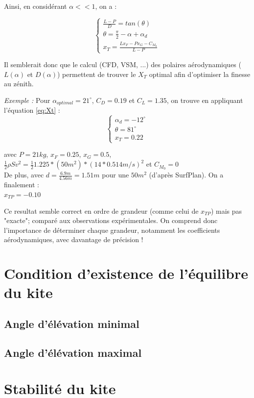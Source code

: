 Ainsi, en considérant $\alpha << 1$, on a :

\begin{equation}
    \begin{cases}
    \frac{L-P}{D} = tan(\theta) \\
    \theta = \frac{\pi}{2} - \alpha + \alpha_d \\
    x_T = \frac{L x_F - P x_G -C_{M_0}}{L - P}
    \end{cases}
    \label{eq:Xt}
\end{equation}
    
Il semblerait donc que le calcul (CFD, VSM, ...) des polaires aérodynamiques ($L(\alpha)$ et $D(\alpha)$) permettent de trouver le $X_T$ optimal afin d'optimiser la finesse au zénith. 

\textit{Exemple : }
Pour $\alpha_{optimal} = 21^\circ$, $C_D = 0.19$ et $C_L = 1.35$, on trouve en appliquant l'équation \ref{eq:Xt} : \\

\begin{equation}
    \begin{cases}
    \alpha_d =  -12^\circ\\
    \theta = 81^\circ\\
    x_T = 0.22
    \end{cases}
    \label{eq:Xt results}
\end{equation}

avec $P = 21 kg$, $x_F = 0.25$, $x_G = 0.5$,$\frac{1}{2} \rho S v^2 = \frac{1}{2} 1.225 * (50m^2) * (14 * 0.514 m/s)^2$  et $C_{M_0} = 0$ \\

De plus, avec  $d = \frac{6.9 m}{4.56 m} = 1.51 m$ pour une $50m^2$ (d'après SurfPlan). On a finalement :\\
$x_{TP} = -0.10 $

Ce resultat semble correct en ordre de grandeur (comme celui de $x_{TP}$) mais pas "exacte"; comparé aux observations expérimentales. On comprend donc l'importance de déterminer chaque grandeur, notamment les coefficients aérodynamiques, avec davantage de précision !

\section{\textbf{Condition d'existence de l'équilibre du kite}} 
\label{sec:Ch1.3}

\subsection{Angle d'élévation minimal} 
\label{sec:Ch1.3.1}

\subsection{Angle d'élévation maximal}
\label{sec:Ch1.3.2}


\section{\textbf{Stabilité du kite}} 
\label{sec:Ch1.4}